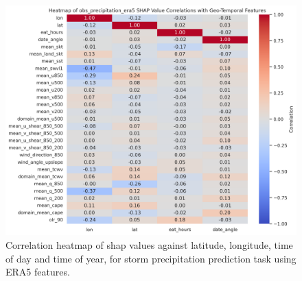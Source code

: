 \begin{figure}[ht]
    \centering
    \includegraphics[width=\textwidth]{../figures/generated/experiments/obs_precipitation/obs_precipitation_era5_shap_correlation_heatmap.png}
    \caption{Correlation heatmap of \acrshort{shap} values against latitude, longitude, time of day and time of year, for storm precipitation prediction task using ERA5 features.}
    \label{fig:obs_precipitation_era5_shap_heatmap}
\end{figure}

